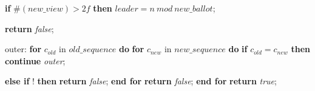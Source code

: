 \begin{algorithm}
\begin{algorithmic}[1]
		\State\hspace{\algorithmicindent} \textbf{if} $\#(new\_view) > 2f$ \textbf{then}
		\State\hspace{\algorithmicindent}\hspace{\algorithmicindent} $leader = n\ mod\ new\_ballot$;
		
				\State
		\State \textbf{return} \textit{false};
		\EndIf
		
		\State
		\item[] outer:	
		\State \textbf{for} $c_{old}$ in $old\_sequence$ \textbf{do}
		\State \hspace{\algorithmicindent} \textbf{for} $c_{new}$ in $new\_sequence$ \textbf{do}
		\State\hspace{\algorithmicindent}\hspace{\algorithmicindent} \textbf{if} $c_{old} = c_{new}$ \textbf{then}
		\State \hspace{\algorithmicindent}\hspace{\algorithmicindent}\hspace{\algorithmicindent} \textbf{continue} \textit{outer};
		
		\State \hspace{\algorithmicindent}\hspace{\algorithmicindent} \textbf{else if} ! \textbf{then}
		\State\hspace{\algorithmicindent}\hspace{\algorithmicindent}\hspace{\algorithmicindent} \textbf{return} \textit{false};
		\State \hspace{\algorithmicindent}\textbf{end for}
		\State \hspace{\algorithmicindent}\textbf{return} \textit{false};
		\State \textbf{end for}
		\State
		\State \textbf{return} \textit{true};
		\EndFunction
	\end{algorithmic}
\end{algorithm}

